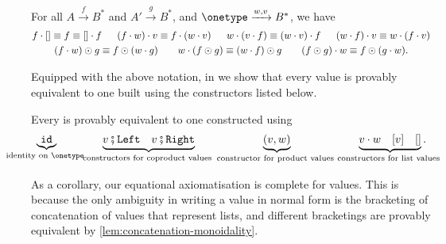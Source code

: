 \begin{lemma}\label{lem:concatenation-monoidality}
    For all  $A \xrightarrow{f} B^*$ and $A' \xrightarrow{g} B^*$, and  $\onetype \xrightarrow{w,v} B^*$, we have
    \begin{gather*}
        f \cdot [] \equiv f \equiv [] \cdot f \quad \;\;
        (f \cdot w) \cdot v \equiv f \cdot (w \cdot v) \quad \;\;
        w \cdot (v \cdot f) \equiv (w \cdot v) \cdot f \quad \;\;
        (w \cdot f) \cdot v \equiv w \cdot (f \cdot v) \\
        (f \cdot w) \odot g \equiv f \odot (w \cdot g) \qquad
        w \cdot (f \odot g) \equiv (w \cdot f) \odot g \qquad
        (f \odot g) \cdot w \equiv f \odot (g \cdot w).
    \end{gather*}
\end{lemma}

Equipped with the above notation, in  we show that every value is provably equivalent to one built using the constructors listed below.
\begin{lemma}\label{lem:value-completeness}
    Every  is provably equivalent to one constructed using 
        \begin{align*}
    \myunderbrace{\idterm}{identity on $\onetype $} \qquad \qquad
    \myunderbrace{v\comp\leftterm \quad v\comp\rightterm}{constructors for coproduct values}
    \qquad  \qquad \qquad 
    \myunderbrace{(v,w)}{constructor for product values}
    \qquad \qquad \qquad 
    \myunderbrace{v \wdot w \quad [v] \quad []}{constructors for list values}.
    \end{align*}
\end{lemma}
As a corollary, our equational axiomatisation is complete for values. This is because the only ambiguity in writing a value in normal form is the bracketing of concatenation of values that represent lists, and different bracketings are provably equivalent by \cref{lem:concatenation-monoidality}.

